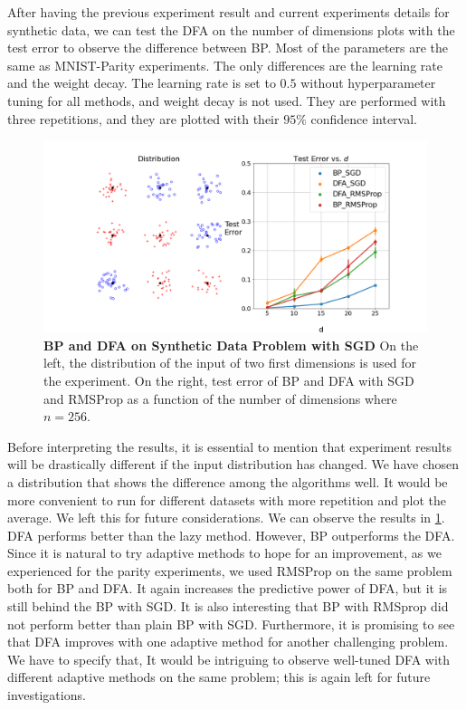 \documentclass[a4paper, nobind]{templates/ociamthesis}
\begin{document}
After having the previous experiment result and current experiments details for synthetic data, we can test the DFA on the number of dimensions plots with the test error to observe the difference between BP. Most of the parameters are the same as MNIST-Parity experiments. The only differences are the learning rate and the weight decay. The learning rate is set to \(0.5\) without hyperparameter tuning for all methods, and weight decay is not used. They are performed with three repetitions, and they are plotted with their \(95\%\) confidence interval.

\begin{figure}

{\centering \includegraphics[width=1\linewidth]{figures/3_syntheticData_adaptive} 

}

\caption[BP and DFA on Synthetic Data Problem with SGD]{\textbf{BP and DFA on Synthetic Data Problem with SGD} \newline On the left, the distribution of the input of two first dimensions is used for the experiment. On the right, test error of BP and DFA with SGD and RMSProp as a function of the number of dimensions where $n = 256$.}\label{fig:DFARandom}
\end{figure}

\noindent Before interpreting the results, it is essential to mention that experiment results will be drastically different if the input distribution has changed. We have chosen a distribution that shows the difference among the algorithms well. It would be more convenient to run for different datasets with more repetition and plot the average. We left this for future considerations.
\noindent We can observe the results in \ref{fig:DFARandom}. DFA performs better than the lazy method. However, BP outperforms the DFA. Since it is natural to try adaptive methods to hope for an improvement, as we experienced for the parity experiments, we used RMSProp on the same problem both for BP and DFA. It again increases the predictive power of DFA, but it is still behind the BP with SGD. It is also interesting that BP with RMSprop did not perform better than plain BP with SGD.
Furthermore, it is promising to see that DFA improves with one adaptive method for another challenging problem. We have to specify that, It would be intriguing to observe well-tuned DFA with different adaptive methods on the same problem; this is again left for future investigations.\\
\end{document}
